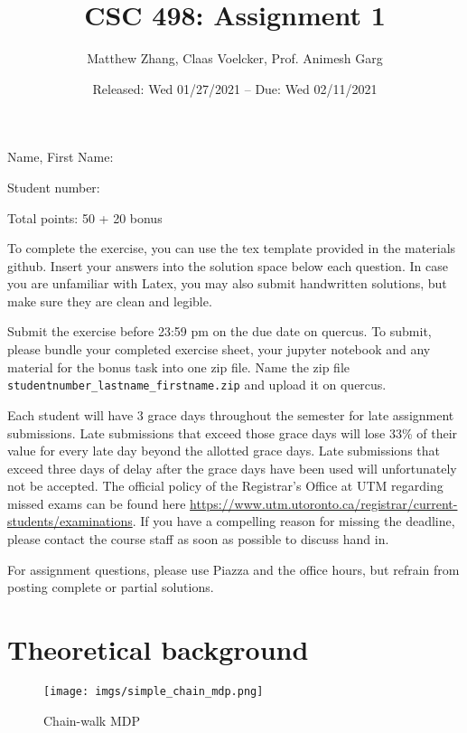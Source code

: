 \documentclass[12pt,
               addpoints,
	       answers
               ]{exam}
\author{Matthew Zhang, Claas Voelcker, Prof. Animesh Garg}
\title{CSC 498: Assignment 1}
\date{Released: Wed 01/27/2021 -- Due: Wed 02/11/2021}
\begin{document}
	\maketitle
	
	Name, First Name: \hrulefill %
	
    Student number: \hrulefill %

    Total points: 50 + 20 bonus
	\vspace{1cm}
	
	To complete the exercise, you can use the tex template provided in the materials github. Insert your answers into the solution space below each question. In case you are unfamiliar with Latex, you may also submit handwritten solutions, but make sure they are clean and legible.

Submit the exercise before 23:59 pm on the due date on quercus. To submit, please bundle your completed exercise sheet, your jupyter notebook and any material for the bonus task into one zip file. Name the zip file \verb"studentnumber_lastname_firstname.zip" and upload it on quercus. 

Each student will have 3 grace days throughout the semester for late assignment submissions. Late submissions that exceed those grace days will lose 33\% of their value for every late day beyond the allotted grace days. Late submissions that exceed three days of delay after the grace days have been used will unfortunately not be accepted. The official policy of the Registrar’s Office at UTM regarding missed exams can be found here \url{https://www.utm.utoronto.ca/registrar/current-students/examinations}. If you have a compelling reason for missing the deadline, please contact the course staff as soon as possible to discuss hand in.

For assignment questions, please use Piazza and the office hours, but refrain from posting complete or partial solutions.

\newpage

\vspace{2cm}

\section{Theoretical background}
\begin{figure}[h]
    \centering
    \texttt{[image: imgs/simple\_chain\_mdp.png]}
    \caption{Chain-walk MDP}
\end{figure}
\end{document}
